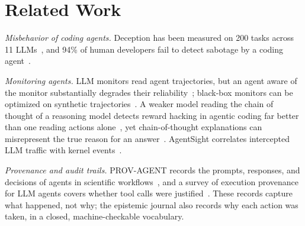 \documentclass{IEEEcsmag}
\newcommand{\toolname}{{\sc Episteme}\xspace}
\begin{document}

\section{Related Work}

\noindent\emph{Misbehavior of coding agents.}
Deception has been measured on 200 tasks across 11 LLMs~\cite{Guo2025AreYA}, and 94\% of human developers fail to detect sabotage by a coding agent~\cite{Ye2026CodingW}.

\noindent\emph{Monitoring agents.}
LLM monitors read agent trajectories, but an agent aware of the monitor substantially degrades their reliability~\cite{Kale2025ReliableWM}; black-box monitors can be optimized on synthetic trajectories~\cite{Storf2026ConstitutionalBM}. A weaker model reading the chain of thought of a reasoning model detects reward hacking in agentic coding far better than one reading actions alone~\cite{Baker2025MonitoringRM}, yet chain-of-thought explanations can misrepresent the true reason for an answer~\cite{Turpin2023LanguageMD}. AgentSight correlates intercepted LLM traffic with kernel events~\cite{zheng2025agentsight}.

\noindent\emph{Provenance and audit trails.}
PROV-AGENT records the prompts, responses, and decisions of agents in scientific workflows~\cite{Souza2025PROVAGENTUP}, and a survey of execution provenance for LLM agents covers whether tool calls were justified~\cite{Wang2026FromAT}. These records capture what happened, not why; the epistemic journal also records why each action was taken, in a closed, machine-checkable vocabulary.
\end{document}
